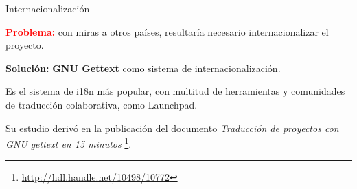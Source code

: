 \begin{frame}{Internacionalización}
  \begin{center}
    \textcolor{red}{\textbf{Problema:}} con miras a otros países, resultaría
    necesario internacionalizar el proyecto.

    \pause \medskip

    \textcolor{dgreen}{\textbf{Solución:}} \textbf{GNU Gettext} como sistema de
    internacionalización. 

    \medskip

    Es el sistema de i18n más popular, con multitud de herramientas y
    comunidades de traducción colaborativa, como Launchpad.
    
    \pause\medskip

    Su estudio derivó en la publicación del documento \textit{Traducción de
      proyectos con GNU gettext en 15 minutos}
    \footnote{\url{http://hdl.handle.net/10498/10772}}.

  \end{center}
\end{frame}
